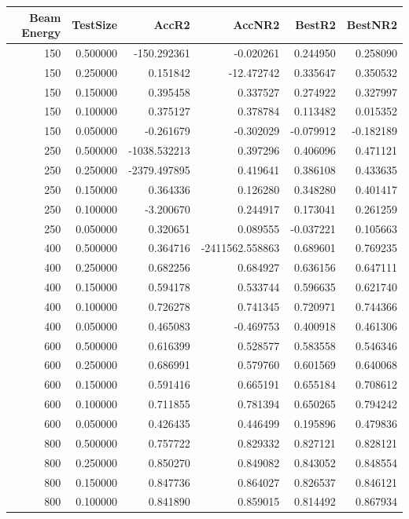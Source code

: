 \begin{tabular}{rrrrrr}
\toprule
Beam Energy & TestSize & AccR2 & AccNR2 & BestR2 & BestNR2 \\
\midrule
150 & 0.500000 & -150.292361 & -0.020261 & 0.244950 & 0.258090 \\
150 & 0.250000 & 0.151842 & -12.472742 & 0.335647 & 0.350532 \\
150 & 0.150000 & 0.395458 & 0.337527 & 0.274922 & 0.327997 \\
150 & 0.100000 & 0.375127 & 0.378784 & 0.113482 & 0.015352 \\
150 & 0.050000 & -0.261679 & -0.302029 & -0.079912 & -0.182189 \\
250 & 0.500000 & -1038.532213 & 0.397296 & 0.406096 & 0.471121 \\
250 & 0.250000 & -2379.497895 & 0.419641 & 0.386108 & 0.433635 \\
250 & 0.150000 & 0.364336 & 0.126280 & 0.348280 & 0.401417 \\
250 & 0.100000 & -3.200670 & 0.244917 & 0.173041 & 0.261259 \\
250 & 0.050000 & 0.320651 & 0.089555 & -0.037221 & 0.105663 \\
400 & 0.500000 & 0.364716 & -2411562.558863 & 0.689601 & 0.769235 \\
400 & 0.250000 & 0.682256 & 0.684927 & 0.636156 & 0.647111 \\
400 & 0.150000 & 0.594178 & 0.533744 & 0.596635 & 0.621740 \\
400 & 0.100000 & 0.726278 & 0.741345 & 0.720971 & 0.744366 \\
400 & 0.050000 & 0.465083 & -0.469753 & 0.400918 & 0.461306 \\
600 & 0.500000 & 0.616399 & 0.528577 & 0.583558 & 0.546346 \\
600 & 0.250000 & 0.686991 & 0.579760 & 0.601569 & 0.640068 \\
600 & 0.150000 & 0.591416 & 0.665191 & 0.655184 & 0.708612 \\
600 & 0.100000 & 0.711855 & 0.781394 & 0.650265 & 0.794242 \\
600 & 0.050000 & 0.426435 & 0.446499 & 0.195896 & 0.479836 \\
800 & 0.500000 & 0.757722 & 0.829332 & 0.827121 & 0.828121 \\
800 & 0.250000 & 0.850270 & 0.849082 & 0.843052 & 0.848554 \\
800 & 0.150000 & 0.847736 & 0.864027 & 0.826537 & 0.846121 \\
800 & 0.100000 & 0.841890 & 0.859015 & 0.814492 & 0.867934 \\

\end{tabular}
